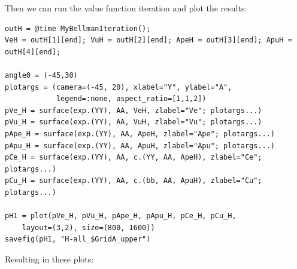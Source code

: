 \documentclass[12pt]{article}
\begin{document}
Then we can run the value function iteration and plot the results:
\begin{lstlisting}[language=JuliaLocal, style=julia]
outH = @time MyBellmanIteration();
VeH = outH[1][end]; VuH = outH[2][end]; ApeH = outH[3][end]; ApuH = outH[4][end];

angle0 = (-45,30)
plotargs = (camera=(-45, 20), xlabel="Y", ylabel="A",
            legend=:none, aspect_ratio=[1,1,2])
pVe_H = surface(exp.(YY), AA, VeH, zlabel="Ve"; plotargs...)
pVu_H = surface(exp.(YY), AA, VuH, zlabel="Vu"; plotargs...)
pApe_H = surface(exp.(YY), AA, ApeH, zlabel="Ape"; plotargs...)
pApu_H = surface(exp.(YY), AA, ApuH, zlabel="Apu"; plotargs...)
pCe_H = surface(exp.(YY), AA, c.(YY, AA, ApeH), zlabel="Ce"; plotargs...)
pCu_H = surface(exp.(YY), AA, c.(bb, AA, ApuH), zlabel="Cu"; plotargs...)

pH1 = plot(pVe_H, pVu_H, pApe_H, pApu_H, pCe_H, pCu_H, 
    layout=(3,2), size=(800, 1600))
savefig(pH1, "H-all_$GridA_upper")
\end{lstlisting}

Resulting in these plots:
\end{document}
